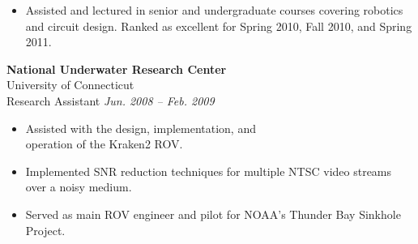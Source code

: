 \documentclass{article}
\begin{document}
{\begin{multicols}{2}
\begin{itemize}[noitemsep,nolistsep]
        \item Assisted and lectured in senior and undergraduate courses covering robotics and circuit design. Ranked as excellent for Spring 2010, Fall 2010, and Spring 2011.
    \end{itemize}
    \vspace{10px}
    \vfill\null
    \columnbreak
    \textbf{National Underwater Research Center}\\ \hfill 
	University of Connecticut\\ 
	Research Assistant \hfill \textsl{Jun. 2008 -- Feb. 2009} \\
    \vspace{ -10px}
    \begin{itemize}[noitemsep,nolistsep]
	\item Assisted with the design, implementation, and \\operation of the Kraken2 ROV.
	\item Implemented SNR reduction techniques for multiple NTSC video streams over a noisy medium.
	\item Served as main ROV engineer and pilot for NOAA's Thunder Bay Sinkhole Project. 
    \end{itemize}
    \vspace{5px}

\end{multicols}}
\end{document}
